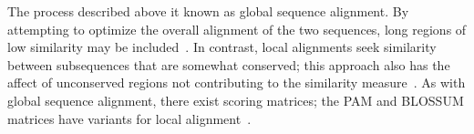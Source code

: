 The process described above it known as global sequence alignment. By attempting to optimize the overall alignment of the two sequences, long regions of low similarity may be included~\cite{needleman1970general}. In contrast, local alignments seek similarity between subsequences that are somewhat conserved; this approach also has the affect of unconserved regions not  contributing to the similarity measure~\cite{goad1982pattern, sellers1984pattern, smith1981comparison}. As with global sequence alignment, there exist scoring matrices; the PAM and BLOSSUM matrices have variants for local alignment~\cite{mount2008comparison}. 
